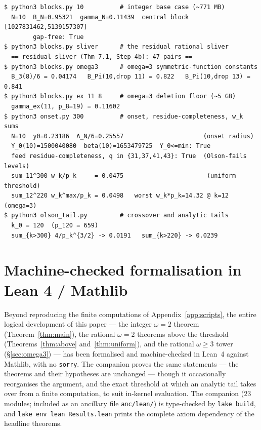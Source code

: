 \documentclass[11pt]{amsart}
\theoremstyle{plain}
\theoremstyle{definition}
\begin{document}
\begin{verbatim}
$ python3 blocks.py 10          # integer base case (~771 MB)
  N=10  B_N=0.95321  gamma_N=0.11439  central block [1027831462,5139157307]
        gap-free: True
$ python3 blocks.py sliver      # the residual rational sliver
  == residual sliver (Thm 7.1, Step 4b): 47 pairs ==
$ python3 blocks.py omega3      # omega=3 symmetric-function constants
  B_3(8)/6 = 0.04174   B_Pi(10,drop 11) = 0.822   B_Pi(10,drop 13) = 0.841
$ python3 blocks.py ex 11 8     # omega=3 deletion floor (~5 GB)
  gamma_ex(11, p_8=19) = 0.11602
$ python3 onset.py 300          # onset, residue-completeness, w_k sums
  N=10  y0=0.23186  A_N/6=0.25557                      (onset radius)
  Y_0(10)=1500040080  beta(10)=1653479725  Y_0<=min: True
  feed residue-completeness, q in {31,37,41,43}: True  (Olson-fails levels)
  sum_11^300 w_k/p_k     = 0.0475                       (uniform threshold)
  sum_12^220 w_k^max/p_k = 0.0498   worst w_k*p_k=14.32 @ k=12   (omega=3)
$ python3 olson_tail.py         # crossover and analytic tails
  k_0 = 120  (p_120 = 659)
  sum_{k>300} 4/p_k^{3/2} -> 0.0191   sum_{k>220} -> 0.0239
\end{verbatim}

\section{Machine-checked formalisation in Lean 4 / Mathlib}\label{app:lean}

Beyond reproducing the finite computations of Appendix~\ref{app:scripts}, the entire
logical development of this paper --- the integer $\omega=2$ theorem
(Theorem~\ref{thm:main}), the rational $\omega=2$ theorems above the threshold
(Theorems~\ref{thm:above} and~\ref{thm:uniform}), and the rational $\omega\ge3$ tower
(\S\ref{sec:omega3}) --- has been formalised and machine-checked in Lean~4 against
Mathlib, with no \texttt{sorry}.  The companion proves the same statements --- the
theorems and their hypotheses are unchanged --- though it occasionally reorganises the
argument, and the exact threshold at which an analytic tail takes over from a finite
computation, to suit in-kernel evaluation.  The companion ($23$ modules; included as an
ancillary file \texttt{anc/lean/}) is type-checked by \texttt{lake build}, and
\texttt{lake env lean Results.lean} prints the complete axiom dependency of the headline
theorems.
\end{document}

